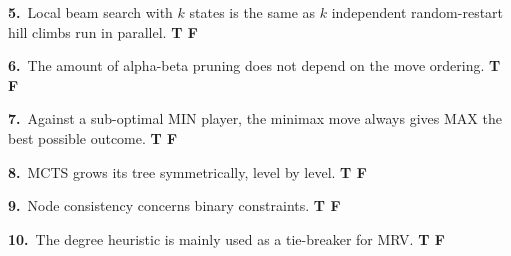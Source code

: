 \documentclass[11pt,a4paper]{article}
\newcommand{\subq}[1]{\par\smallskip\noindent\textbf{#1}\ }
\begin{document}
\subq{5.}Local beam search with $k$ states is the same as $k$ independent random-restart hill climbs run in parallel. \hfill \textbf{T \quad F}
\begin{ansbox}[height=1.5cm]\end{ansbox}
\subq{6.}The amount of alpha-beta pruning does not depend on the move ordering. \hfill \textbf{T \quad F}
\begin{ansbox}[height=1.5cm]\end{ansbox}
\subq{7.}Against a sub-optimal MIN player, the minimax move always gives MAX the best possible outcome. \hfill \textbf{T \quad F}
\begin{ansbox}[height=1.5cm]\end{ansbox}
\subq{8.}MCTS grows its tree symmetrically, level by level. \hfill \textbf{T \quad F}
\begin{ansbox}[height=1.5cm]\end{ansbox}
\subq{9.}Node consistency concerns binary constraints. \hfill \textbf{T \quad F}
\begin{ansbox}[height=1.5cm]\end{ansbox}
\subq{10.}The degree heuristic is mainly used as a tie-breaker for MRV. \hfill \textbf{T \quad F}
\begin{ansbox}[height=1.5cm]\end{ansbox}
\end{document}
